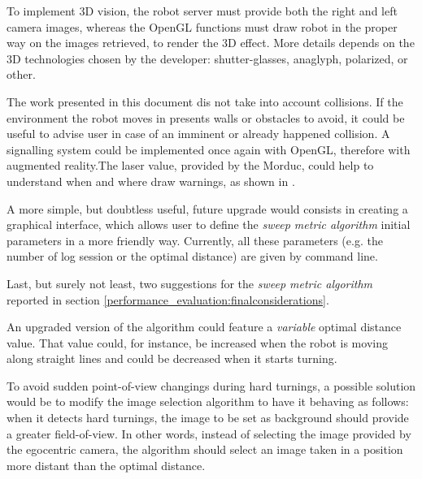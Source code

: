 %
To implement 3D vision, the robot server must provide both the right and left camera images,
whereas the OpenGL functions must draw robot in the proper way on the images retrieved, to render
the 3D effect. More details depends on the 3D technologies chosen by the developer: shutter-glasses,
anaglyph, polarized, or other.
%

%
The work presented in this document dis not take into account 
collisions. If the environment the robot moves in presents walls 
or obstacles to avoid, it could be useful to advise user in case 
of an imminent or already happened collision.
%
A signalling system could be implemented once again with OpenGL, therefore 
with augmented reality.The laser value, provided by the Morduc,
could help to understand when and where draw warnings, as shown in 
\cite{morduc:macalusodetommaso}.
%

%
A more simple, but doubtless useful, future upgrade would consists in 
creating a graphical interface, which allows user to define the
\textit{sweep metric algorithm} initial parameters in a more friendly way. 
%
Currently, all these parameters (e.g. the number of log session or the 
optimal distance) are given by command line.
%

%
Last, but surely not least, two suggestions for the 
\textit{sweep metric algorithm} reported in section 
\ref{performance_evaluation:finalconsiderations}.
%

%
An upgraded version of the algorithm could feature a 
\textit{variable} optimal distance value. That value 
could, for instance, be increased when the robot is moving 
along straight lines and could be decreased when it starts 
turning.
%

%
To avoid sudden point-of-view changings during hard turnings, 
a possible solution would be to modify the image selection algorithm 
to have it behaving as follows: when it detects hard turnings, the 
image to be set as background should provide a greater field-of-view. 
In other words, instead of selecting the image provided by the 
egocentric camera, the algorithm should select an image taken 
in a position more distant than the optimal distance.
%
